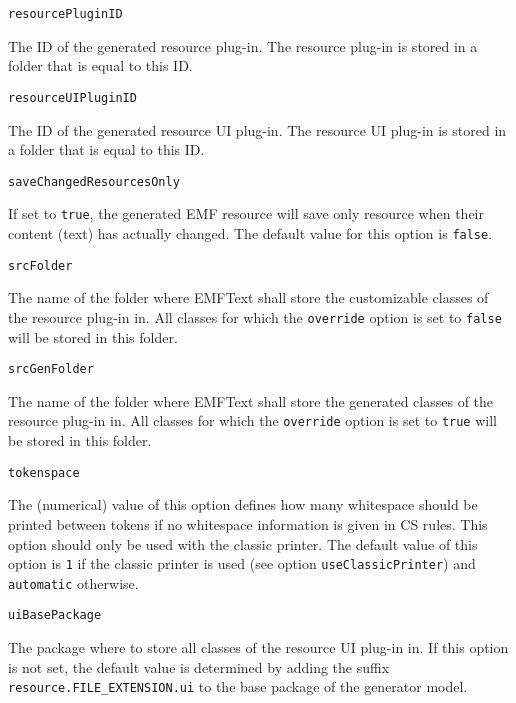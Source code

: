 \noindent\texttt{resourcePluginID}
\begin{myindentpar}{1cm}
The ID of the generated resource plug-in. The resource plug-in is stored in a folder that is equal to this ID.
\end{myindentpar}

\noindent\texttt{resourceUIPluginID}
\begin{myindentpar}{1cm}
The ID of the generated resource UI plug-in. The resource UI plug-in is stored in a folder that is equal to this ID.
\end{myindentpar}

\noindent\texttt{saveChangedResourcesOnly}
\begin{myindentpar}{1cm}
If set to \texttt{true}, the generated EMF resource will save only resource when their content (text) has actually changed. The default value for this option is \texttt{false}.
\end{myindentpar}

\noindent\texttt{srcFolder}
\begin{myindentpar}{1cm}
The name of the folder where EMFText shall store the customizable classes of the resource plug-in in. All classes for which the \texttt{override} option is set to \texttt{false} will be stored in this folder.
\end{myindentpar}

\noindent\texttt{srcGenFolder}
\begin{myindentpar}{1cm}
The name of the folder where EMFText shall store the generated classes of the resource plug-in in. All classes for which the \texttt{override} option is set to \texttt{true} will be stored in this folder.
\end{myindentpar}

\noindent\texttt{tokenspace}
\begin{myindentpar}{1cm}
The (numerical) value of this option defines how many whitespace should be printed between tokens if no whitespace information is given in CS rules. This option should only be used with the classic printer. The default value of this option is \texttt{1} if the classic printer is used (see option \texttt{useClassicPrinter}) and \texttt{automatic} otherwise.
\end{myindentpar}

\noindent\texttt{uiBasePackage}
\begin{myindentpar}{1cm}
The package where to store all classes of the resource UI plug-in in. If this option is not set, the default value is determined by adding the suffix \texttt{resource.FILE\_EXTENSION.ui} to the base package of the generator model.
\end{myindentpar}


